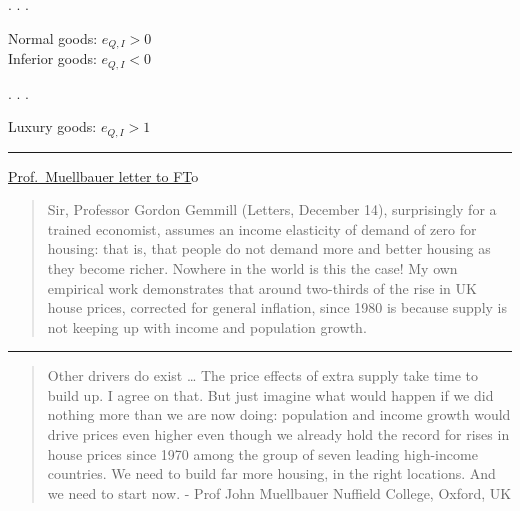 \documentclass[]{article}
\begin{document}
. . .

Normal goods: \(e_{Q,I} > 0\)\\

Inferior goods: \(e_{Q,I} < 0\)

. . .

Luxury goods: \(e_{Q,I} > 1\)




\begin{center}\rule{0.5\linewidth}{\linethickness}\end{center}

\href{https://www.ft.com/content/4ea79d96-a4d6-11e5-a91e-162b86790c58}{Prof.~Muellbauer
letter to FT}o

\begin{quote}
Sir, Professor Gordon Gemmill (Letters, December 14), surprisingly for a
trained economist, assumes an income elasticity of demand of zero for
housing: that is, that people do not demand more and better housing as
they become richer. Nowhere in the world is this the case! My own
empirical work demonstrates that around two-thirds of the rise in UK
house prices, corrected for general inflation, since 1980 is because
supply is not keeping up with income and population growth.
\end{quote}

\begin{center}\rule{0.5\linewidth}{\linethickness}\end{center}

\begin{quote}
Other drivers do exist \ldots{} The price effects of extra supply take
time to build up. I agree on that. But just imagine what would happen if
we did nothing more than we are now doing: population and income growth
would drive prices even higher even though we already hold the record
for rises in house prices since 1970 among the group of seven leading
high-income countries. We need to build far more housing, in the right
locations. And we need to start now. - Prof John Muellbauer Nuffield
College, Oxford, UK
\end{quote}
\end{document}
